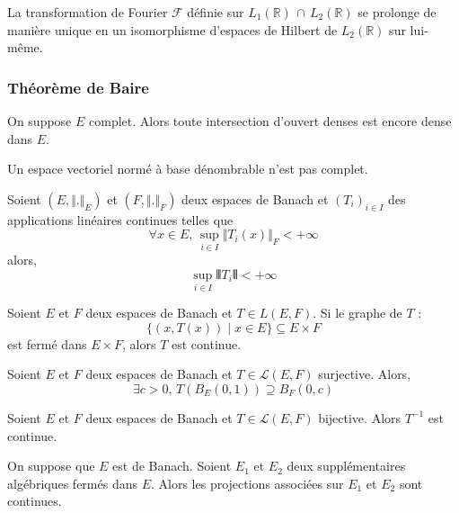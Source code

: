 
	\begin{application}
		La transformation de Fourier $\mathcal{F}$ définie sur $L_1(\mathbb{R}) \, \cap \, L_2(\mathbb{R})$ se prolonge de manière unique en un isomorphisme d'espaces de Hilbert de $L_2(\mathbb{R})$ sur lui-même.
	\end{application}

	\subsubsection{Théorème de Baire}


	\begin{theorem}[Baire]
		On suppose $E$ complet. Alors toute intersection d'ouvert denses est encore dense dans $E$.
	\end{theorem}


	\begin{application}
		Un espace vectoriel normé à base dénombrable n'est pas complet.
	\end{application}


	\begin{application}
		Soient $(E, \Vert . \Vert_E)$ et $(F, \Vert . \Vert_F)$ deux espaces de Banach et $(T_i)_{i \in I}$ des applications linéaires continues telles que
		\[ \forall x \in E, \, \sup_{i \in I} \Vert T_i(x) \Vert_F < +\infty \]
		alors,
		\[ \sup_{i \in I} \VERT T_i \VERT < +\infty \]
	\end{application}

	\begin{application}
		Soient $E$ et $F$ deux espaces de Banach et $T \in L(E,F)$. Si le graphe de $T$ :
		\[ \{ (x, T(x)) \mid x \in E \} \subseteq E \times F \]
		est fermé dans $E \times F$, alors $T$ est continue.
	\end{application}

	\begin{application}
		Soient $E$ et $F$ deux espaces de Banach et $T \in \mathcal{L}(E,F)$ surjective. Alors,
		\[ \exists c > 0, \, T\left(B_E(0,1)\right) \supseteq B_F(0,c) \]
	\end{application}

	\begin{corollary}
		Soient $E$ et $F$ deux espaces de Banach et $T \in \mathcal{L}(E,F)$ bijective. Alors $T^{-1}$ est continue.
	\end{corollary}

	\begin{corollary}
		On suppose que $E$ est de Banach. Soient $E_1$ et $E_2$ deux supplémentaires algébriques fermés dans $E$. Alors les projections associées sur $E_1$ et $E_2$ sont continues.
	\end{corollary}

